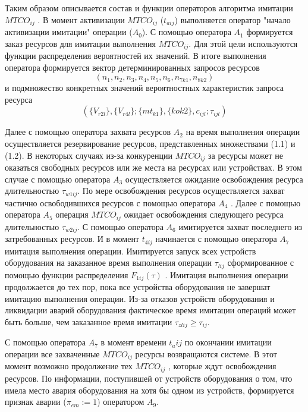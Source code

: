 Таким образом описывается состав и функции операторов алгоритма имитации $MTCO_{ij}$ . В момент активизации  $MTCO_{ij}$ ($t_{aij}$)   выполняется оператор "начало активизации имитации" операции  ($A_0$).
С помощью оператора $A_1$ формируется заказ ресурсов для имитации выполнения  $MTCO_{ij}$.  Для этой цели используются функции распределения вероятностей их значений.  В итоге выполнения оператора формируется вектор детерминированных запросов ресурсов
\begin{equation*}
		(n_1,n_2,n_3,n_4,n_5,n_6,n_{7k1},n_{8k2})
\end{equation*}
и подмножество конкретных значений вероятностных характеристик запроса ресурса
\begin{equation*}
        ( \{V_{r2l}\} , \{V_{r4l}\} ; \{mt_{k1}\} , \{ko{k2}\} , c_{ijl} ;\tau_{ijl} )
\end{equation*}

Далее с помощью оператора захвата ресурсов $A_2$  на время выполнения операции осуществляется резервирование ресурсов, представленных множествами (1.1) и (1.2). В некоторых случаях из-за конкуренции $MTCO_{ij}$ за ресурсы может не оказаться свободных ресурсов или же места на ресурсах или устройствах. В этом случае с помощью оператора $A_3$  осуществляется ожидание освобождения ресурса длительностью $\tau_{w1ij}$. По мере освобождения ресурсов осуществляется захват частично освободившихся ресурсов с помощью оператора $A_4$ . Далее с помощью оператора $A_5$ операция $MTCO_{ij}$ ожидает освобождения следующего ресурса длительностью $\tau_{w2ij}$.  С помощью оператора $A_6$ имитируется захват последнего из затребованных ресурсов. И в момент $t_{4ij}$  начинается с помощью оператора $A_7$ имитация выполнения операции. Имитируется запуск всех устройств оборудования на заказанное время выполнения операции $\tau_{lij}$ сформированное с помощью функции распределения $F_{1ij}(\tau)$ . Имитация выполнения операции продолжается до тех пор, пока все устройства оборудования не завершат имитацию выполнения операции. Из-за отказов устройств оборудования и ликвидации аварий  оборудования фактическое время имитации операций может быть больше, чем заказанное время имитации $\tau_{zlij} \geq \tau_{ij}$.

С помощью оператора $A_7$ в момент времени $t_aij$ по окончании имитации операции все захваченные $MTCO_{ij}$ ресурсы возвращаются системе. В этот момент возможно продолжение тех $MTCO_{ij}$ , которые ждут освобождения ресурсов. По информации, поступившей от устройств оборудования о том, что имела место авария оборудования на хотя бы одном из устройств, формируется признак аварии ($\pi_{em}:=1$) оператором $A_9$.

